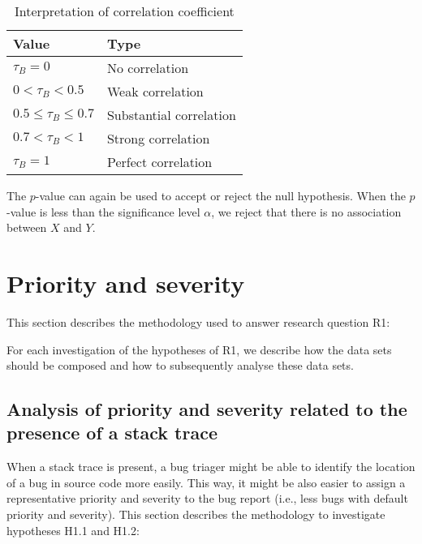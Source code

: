 \begin{table}[!ht]\footnotesize
	\centering
	\begin{tabular}{ll}
		\toprule
		Value & Type \\
		\midrule
		$\tau_B = 0$ & No correlation \\
		$0 < \tau_B < 0.5$ & Weak correlation \\
		$0.5 \leq \tau_B \leq 0.7$ & Substantial correlation \\
		$0.7 < \tau_B < 1$ & Strong correlation \\
		$\tau_B = 1$ & Perfect correlation \\
		\bottomrule
	\end{tabular} 
	\caption{Interpretation of correlation coefficient}
	\label{tab:tau_correlation}
\end{table}

The $p$-value can again be used to accept or reject the null hypothesis. When the $p$-value is less than the significance level $\alpha$, we reject that there is no association between $X$ and $Y$. 


\section{Priority and severity} %
\label{sec:analysis:priority_and_severity}

This section describes the methodology used to answer research question R1:

\vspace{\baselineskip}
\questiona{}
\vspace{\baselineskip}

For each investigation of the hypotheses of R1, we describe how the data sets should be composed and how to subsequently analyse these data sets.

\subsection{Analysis of priority and severity related to the presence of a stack trace} %
\label{sub:da:analysis_of_priority_and_severity_related_to_the_presence_of_a_stack_trace}
When a stack trace is present, a bug triager might be able to identify the location of a bug in source code more easily. This way, it might be also easier to assign a representative priority and severity to the bug report (i.e., less bugs with default priority and severity). This section describes the methodology to investigate hypotheses H1.1 and H1.2:

